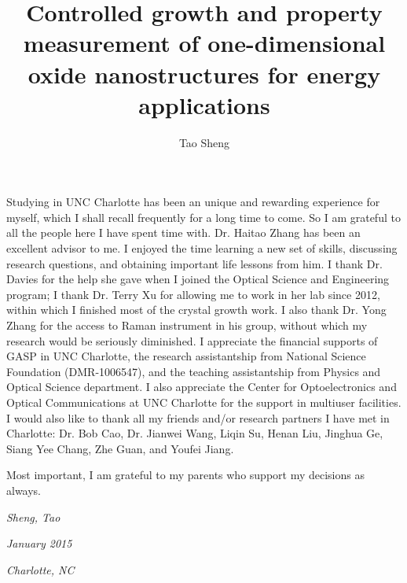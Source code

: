   \title{Controlled growth and property measurement of one-dimensional oxide nanostructures for energy applications}
  \author{Tao Sheng}
  \thesisyear{\the\year}



\maketitle



\begin{ackn}
\begin{singlespace}
Studying in UNC Charlotte has been an unique and rewarding experience for myself, which I shall recall frequently for a long time to come. So I am grateful to all the people here I have spent time with. Dr. Haitao Zhang has been an excellent advisor to me. I enjoyed the time learning a new set of skills, discussing research questions, and obtaining important life lessons from him. I thank Dr. Davies for the help she gave when I joined the Optical Science and Engineering program; I thank Dr. Terry Xu for allowing me to work in her lab since 2012, within which I finished most of the crystal growth work. I also thank Dr. Yong Zhang for the access to Raman instrument in his group, without which my research would be seriously diminished. I appreciate the financial supports of GASP in UNC Charlotte, the research assistantship from National Science Foundation (DMR-1006547), and the teaching assistantship from Physics and Optical Science department. I also appreciate the Center for Optoelectronics and Optical Communications at UNC Charlotte for the support in multiuser facilities. I would also like to thank all my friends and/or research partners I have met in Charlotte: Dr. Bob Cao, Dr. Jianwei Wang, Liqin Su, Henan Liu, Jinghua Ge, Siang Yee Chang, Zhe Guan, and Youfei Jiang. 

Most important, I am grateful to my parents who support my decisions as always. 


\begin{minipage}[b]{0.95\textwidth}

\begin{flushright}

\emph{Sheng, Tao}

\emph{January 2015}

\emph{Charlotte, NC}

\end{flushright}
\end{minipage}
\end{singlespace}
\end{ackn}

